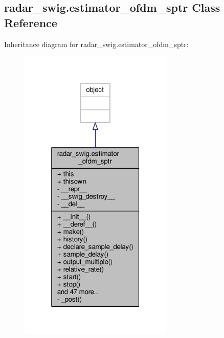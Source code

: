 \subsection{radar\+\_\+swig.\+estimator\+\_\+ofdm\+\_\+sptr Class Reference}
\label{classradar__swig_1_1estimator__ofdm__sptr}


Inheritance diagram for radar\+\_\+swig.\+estimator\+\_\+ofdm\+\_\+sptr\+:
\nopagebreak
\begin{figure}[H]
\begin{center}
\leavevmode
\includegraphics[width=208pt]{d2/d30/classradar__swig_1_1estimator__ofdm__sptr__inherit__graph}
\end{center}
\end{figure}


